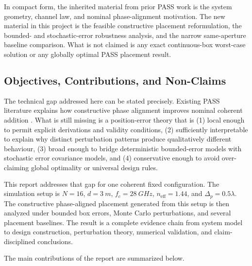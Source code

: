 In compact form, the inherited material from prior PASS work is the system geometry, channel law, and nominal phase-alignment motivation. The new material in this project is the feasible constructive placement reformulation, the bounded- and stochastic-error robustness analysis, and the narrow same-aperture baseline comparison. What is not claimed is any exact continuous-box worst-case solution or any globally optimal PASS placement result.

\subsection{Objectives, Contributions, and Non-Claims}

The technical gap addressed here can be stated precisely. Existing PASS literature explains how constructive phase alignment improves nominal coherent addition \cite{ding2025perspective,ouyang2025array}. What is still missing is a position-error theory that is (1) local enough to permit explicit derivations and validity conditions, (2) sufficiently interpretable to explain why distinct perturbation patterns produce qualitatively different behaviour, (3) broad enough to bridge deterministic bounded-error models with stochastic error covariance models, and (4) conservative enough to avoid over-claiming global optimality or universal design rules.

This report addresses that gap for one coherent fixed configuration. The simulation setup is $N = 16$, $d = \SI{3}{m}$, $f_c = \SI{28}{GHz}$, $n_{\mathrm{eff}} = 1.44$, and $\Delta_p = 0.5\lambda$. The constructive phase-aligned placement generated from this setup is then analyzed under bounded box errors, Monte Carlo perturbations, and several placement baselines. The result is a complete evidence chain from system model to design construction, perturbation theory, numerical validation, and claim-disciplined conclusions.

The main contributions of the report are summarized below.

